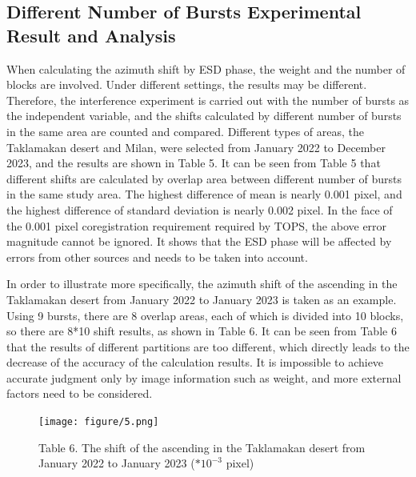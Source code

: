 \documentclass[a4paper,fleqn]{cas-dc}
\begin{document}
\subsection{Different Number of Bursts Experimental Result and Analysis}
When calculating the azimuth shift by ESD phase, the weight and the number of blocks are involved. Under different settings, the results may be different. Therefore, the interference experiment is carried out with the number of bursts as the independent variable, and the shifts calculated by different number of bursts in the same area are counted and compared. Different types of areas, the Taklamakan desert and Milan, were selected from January 2022 to December 2023, and the results are shown in Table 5. It can be seen from Table 5 that different shifts are calculated by overlap area between different number of bursts in the same study area. The highest difference of mean is nearly 0.001 pixel, and the highest difference of standard deviation is nearly 0.002 pixel. In the face of the 0.001 pixel coregistration requirement required by TOPS, the above error magnitude cannot be ignored. It shows that the ESD phase will be affected by errors from other sources and needs to be taken into account. \par
In order to illustrate more specifically, the azimuth shift of the ascending in the Taklamakan desert from January 2022 to January 2023 is taken as an example. Using 9 bursts, there are 8 overlap areas, each of which is divided into 10 blocks, so there are 8*10 shift results, as shown in Table 6. It can be seen from Table 6 that the results of different partitions are too different, which directly leads to the decrease of the accuracy of the calculation results. It is impossible to achieve accurate judgment only by image information such as weight, and more external factors need to be considered. \par
\begin{figure}
	\centering 
	\texttt{[image: figure/5.png]}	
	\caption{Table 6. The shift of the ascending in the Taklamakan desert from January 2022 to January 2023 ($*10^{-3}$ pixel)} 
	\label{fig_8}
\end{figure}
\end{document}
